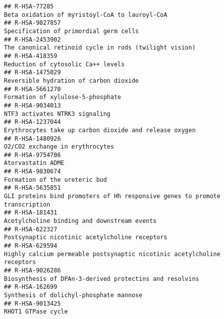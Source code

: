 \documentclass[
]{article}
\begin{document}
\begin{verbatim}
## R-HSA-77285                                                                                         Beta oxidation of myristoyl-CoA to lauroyl-CoA
## R-HSA-9827857                                                                                               Specification of primordial germ cells
## R-HSA-2453902                                                                               The canonical retinoid cycle in rods (twilight vision)
## R-HSA-418359                                                                                                    Reduction of cytosolic Ca++ levels
## R-HSA-1475029                                                                                               Reversible hydration of carbon dioxide
## R-HSA-5661270                                                                                                    Formation of xylulose-5-phosphate
## R-HSA-9034013                                                                                                       NTF3 activates NTRK3 signaling
## R-HSA-1237044                                                                               Erythrocytes take up carbon dioxide and release oxygen
## R-HSA-1480926                                                                                                      O2/CO2 exchange in erythrocytes
## R-HSA-9754706                                                                                                                    Atorvastatin ADME
## R-HSA-9830674                                                                                                        Formation of the ureteric bud
## R-HSA-5635851                                                          GLI proteins bind promoters of Hh responsive genes to promote transcription
## R-HSA-181431                                                                                           Acetylcholine binding and downstream events
## R-HSA-622327                                                                                        Postsynaptic nicotinic acetylcholine receptors
## R-HSA-629594                                                               Highly calcium permeable postsynaptic nicotinic acetylcholine receptors
## R-HSA-9026286                                                                              Biosynthesis of DPAn-3-derived protectins and resolvins
## R-HSA-162699                                                                                               Synthesis of dolichyl-phosphate mannose
## R-HSA-9013425                                                                                                                   RHOT1 GTPase cycle

\end{verbatim}
\end{document}
